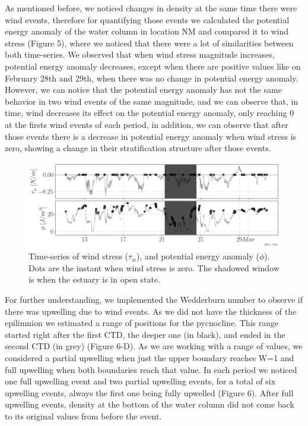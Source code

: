 \documentclass[tesis.tex]{subfiles}
\begin{document}
As mentioned before, we noticed changes in density at the same time there were wind events, therefore for quantifying those events we calculated the potential energy anomaly of the water column in location NM and compared it to wind stress (Figure 5), where we noticed that there were a lot of similarities between both time-series. We observed that when wind stress magnitude increases, potential energy anomaly decreases, except when there are positive values like on February 28th and 29th, when there was no change in potential energy anomaly. However, we can notice that the potential energy anomaly has not the same behavior in two wind events of the same magnitude, and we can observe that, in time, wind decreases its effect on the potential energy anomaly, only reaching 0 at the firsts wind events of each period, in addition, we can observe that after those events there is a decrease in potential energy anomaly when wind stress is zero, showing a change in their stratification structure after those events.

\begin{figure}[h!]
    \centering
    \includegraphics[width=\textwidth]{Imagenes/phi.png}
    \caption{Time-series of wind stress ($\tau_w$), and potential energy anomaly ($\phi$). Dots are the instant when wind stress is zero. The shadowed window is when the estuary is in open state.}
    \label{fig:phi}
\end{figure}

For further understanding, we implemented the Wedderburn number to observe if there was upwelling due to wind events. As we did not have the thickness of the epilimnion we estimated a range of positions for the pycnocline. This range started right after the first CTD, the deeper one (in black), and ended in the second CTD (in grey) (Figure 6-D). As we are working with a range of values, we considered a partial upwelling when just the upper boundary reaches W=1 and full upwelling when both boundaries reach that value. In each period we noticed one full upwelling event and two partial upwelling events, for a total of six upwelling events, always the first one being fully upwelled (Figure 6). After full upwelling events, density at the bottom of the water column did not come back to its original values from before the event. 
\end{document}

